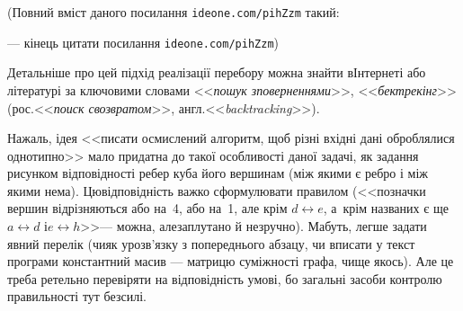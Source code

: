 \documentclass[14pt,a4paper]{extarticle}
\renewcommand{\baselinestretch}{1.3125}
\begin{document}
{\color{green}\begin{small}

\renewcommand{\baselinestretch}{0.875}

(Повний вміст даного посилання \verb"ideone.com/pihZzm" такий:

--- кінець цитати посилання \verb"ideone.com/pihZzm")

\end{small}}


\hspace{0.5em plus 1em} Детальніше про цей підхід реалізації перебору можна знайти в\nolinebreak[3] Інтернеті або літературі за ключовими словами <<\emph{пошук з\nolinebreak[3] поверненнями}>>, <<\emph{бектрекінг}>> (рос.\nolinebreak[3] <<\emph{поиск с\nolinebreak[3] возвратом}>>, англ.\nolinebreak[3] <<\emph{backtracking}>>).

На\nolinebreak[3] жаль, ідея <<писати осмислений алгоритм, щоб різні вхідні дані оброблялися однотипно>> мало придатна до такої особливості даної задачі, як задання рисунком відповідності ребер куба його вершинам (між якими є ребро і між якими нема). Цю\nolinebreak[3] відповідність важко сформулювати правилом (<<позначки вершин відрізняються або на~4, або на~1, але крім $d{\leftrightarrow}e$, а~крім названих є ще $a{\leftrightarrow}d$ і\nolinebreak[3] $e{\leftrightarrow}h$>>\nolinebreak[3] --- можна, але\nolinebreak[2] заплутано й незручно).  Мабуть, легше задати явний перелік (чи\nolinebreak[3] як у\nolinebreak[3] розв'язку з попереднього абзацу, чи вписати у текст програми константний масив --- матрицю суміжності графа, чи\nolinebreak[2] ще якось). Але це треба ретельно перевіряти на відповідність умові, бо загальні засоби контролю правильності тут безсилі.
\end{document}
